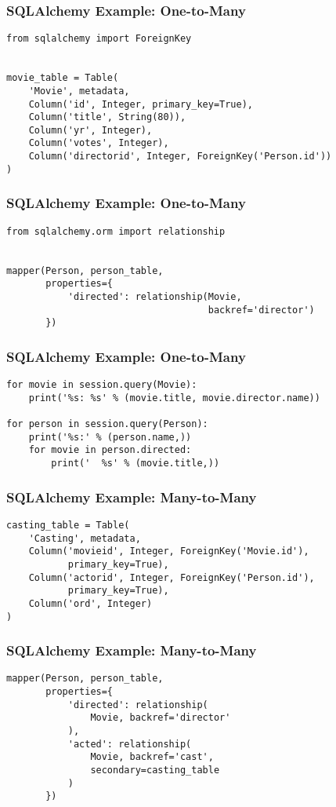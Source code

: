 \documentclass[dvipsnames]{beamer}
\theoremstyle{plain}
\begin{document}
\begin{frame}[fragile]
  \frametitle{SQLAlchemy Example: One-to-Many}

  \begin{lstlisting}
from sqlalchemy import ForeignKey


movie_table = Table(
    'Movie', metadata,
    Column('id', Integer, primary_key=True),
    Column('title', String(80)),
    Column('yr', Integer),
    Column('votes', Integer),
    Column('directorid', Integer, ForeignKey('Person.id'))
)
  \end{lstlisting}
\end{frame}

\begin{frame}[fragile]
  \frametitle{SQLAlchemy Example: One-to-Many}

  \begin{lstlisting}
from sqlalchemy.orm import relationship


mapper(Person, person_table,
       properties={
           'directed': relationship(Movie,
                                    backref='director')
       })
  \end{lstlisting}
\end{frame}

\begin{frame}[fragile]
  \frametitle{SQLAlchemy Example: One-to-Many}

  \begin{lstlisting}
for movie in session.query(Movie):
    print('%s: %s' % (movie.title, movie.director.name))

for person in session.query(Person):
    print('%s:' % (person.name,))
    for movie in person.directed:
        print('  %s' % (movie.title,))
  \end{lstlisting}
\end{frame}

\begin{frame}[fragile]
  \frametitle{SQLAlchemy Example: Many-to-Many}

  \begin{lstlisting}
casting_table = Table(
    'Casting', metadata,
    Column('movieid', Integer, ForeignKey('Movie.id'),
           primary_key=True),
    Column('actorid', Integer, ForeignKey('Person.id'),
           primary_key=True),
    Column('ord', Integer)
)
  \end{lstlisting}
\end{frame}

\begin{frame}[fragile]
  \frametitle{SQLAlchemy Example: Many-to-Many}

  \begin{lstlisting}
mapper(Person, person_table,
       properties={
           'directed': relationship(
               Movie, backref='director'
           ),
           'acted': relationship(
               Movie, backref='cast',
               secondary=casting_table
           )
       })
  \end{lstlisting}
\end{frame}
\end{document}
